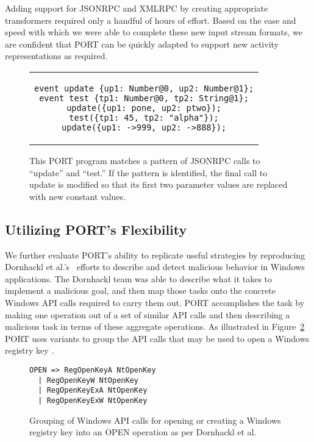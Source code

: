 Adding support for JSONRPC and XMLRPC by creating
appropriate transformers required only a handful of hours of effort.
Based on the ease and speed with which we
were able to complete these new input stream formats, we are confident that PORT can be
quickly adapted to support new activity representations as required.

\begin{figure}[H]
\centering
\begin{tabular}{c}
\begin{lstlisting}
event update {up1: Number@0, up2: Number@1};
event test {tp1: Number@0, tp2: String@1};
update({up1: pone, up2: ptwo});
test({tp1: 45, tp2: "alpha"});
update({up1: ->999, up2: ->888});
\end{lstlisting}
\end{tabular}
\caption{This PORT program matches a pattern of JSONRPC calls to
  ``update'' and ``test.''  If the pattern is identified, the final call to
  update is modified so that its first two parameter values are replaced
  with new constant values.}
\label{lst:JSONProgram}
\end{figure}


\subsection{Utilizing PORT's Flexibility}
We further evaluate PORT's ability to replicate useful strategies by
reproducing Dornhackl et al.'s~\cite{Dornhackl2014}
efforts to describe and detect malicious behavior in Windows
applications.  The Dornhackl team was able to describe what it takes to implement a malicious goal, and then
map those tasks onto the
concrete Windows API calls required to carry them out. PORT accomplishes the task by making one operation out of a set of similar API calls and then describing a malicious task  in terms of
these aggregate operations. As illustrated in  Figure~\ref{lst:DornhacklOpen} PORT uses variants to group the API calls that may be used to
open a Windows registry key \cite{Dornhackl2014}. 

\begin{figure}
\begin{lstlisting}
OPEN => RegOpenKeyA NtOpenKey
  | RegOpenKeyW NtOpenKey
  | RegOpenKeyExA NtOpenKey
  | RegOpenKeyExW NtOpenKey
\end{lstlisting}
\caption{Grouping of Windows API calls for opening or creating a Windows
  registry key into an OPEN operation as per Dornhackl et al.}
\label{lst:DornhacklOpen}
\end{figure}

